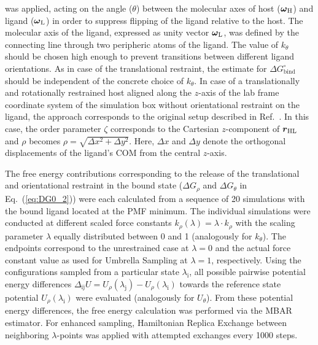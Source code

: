 \documentclass[9pt,lessons]{livecoms}
\begin{document}
was applied, acting on the angle ($\theta$) between the molecular axes of host ($\text{\boldmath$\omega$}_\mathrm{H}$) and 
ligand ($\text{\boldmath$\omega$}_\mathrm{L}$) in order to suppress flipping of the ligand relative to the host.
The molecular axis of the ligand, expressed as unity vector $\text{\boldmath$\omega$}_\mathrm{L}$, was defined by the connecting line through two peripheric atoms of the ligand.
The value of $k_\theta$ should be chosen high enough to prevent transitions between different ligand orientations. 
As in case of the translational restraint, the estimate for $\Delta G^\circ_\mathrm{bind}$ should be independent of the concrete choice of $k_\theta$.
In case of a translationally and rotationally restrained host aligned along the $z$-axis of the lab frame coordinate system of the simulation box without orientational restraint on the ligand, the approach corresponds to the original setup described in Ref.~.
In this case, the order parameter $\zeta$ corresponds to the Cartesian $z$-component of $\text{\boldmath $r$}_\mathrm{HL}$ and $\rho$ becomes $\rho = \sqrt{\Delta x^2 + \Delta y^2}$.
Here, $\Delta x$ and $\Delta y$ denote the orthogonal displacements of the ligand's COM from the central $z$-axis.

The free energy contributions corresponding to the release of the translational and orientational restraint in the bound state ($\Delta G_\rho$ and $\Delta G_\theta$ in Eq.~(\ref{eq:DG0_2})) 
were each calculated from a sequence of 20 simulations with the bound ligand located at the PMF minimum. 
The individual simulations were conducted at different scaled force constants $k_\rho(\lambda) = \lambda \cdot k_\rho$ with the scaling parameter $\lambda$ equally distributed between 0 and 1 (analogously for $k_\theta$).  
The endpoints correspond to the unrestrained case at $\lambda = 0$ and the actual force constant value as used for Umbrella Sampling at $\lambda = 1$, respectively.
Using the configurations sampled from a particular state $\lambda_\mathrm{i}$, all possible pairwise potential energy differences $\Delta_\mathrm{ij} U = U_\rho(\lambda_\mathrm{j}) - U_\rho(\lambda_\mathrm{i})$ 
towards the reference state potential $U_\rho(\lambda_\mathrm{i})$ were evaluated (analogously for $U_\theta$). 
From these potential energy differences, the free energy calculation was performed via the MBAR estimator. 
For enhanced sampling, Hamiltonian Replica Exchange between neighboring $\lambda$-points was applied with attempted exchanges every 1000 steps. 
\end{document}

